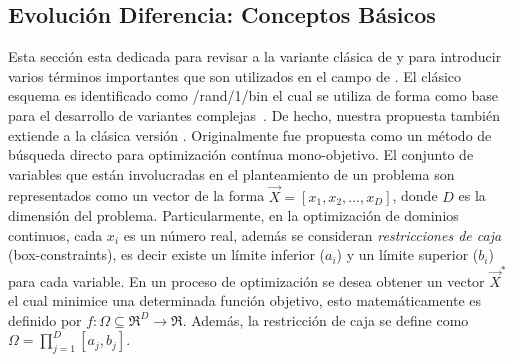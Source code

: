 \subsection{Evolución Diferencia: Conceptos Básicos}

Esta sección esta dedicada para revisar a la variante clásica de \DE{} y para introducir varios términos importantes que son utilizados en el campo de \DE{}.
%
El clásico esquema \DE{} es identificado como \DE{}/rand/1/bin el cual se utiliza de forma como base para el desarrollo de variantes complejas~\cite{das2011differential}.
%
De hecho, nuestra propuesta también extiende a la clásica versión \DE{}.
%
Originalmente \DE{} fue propuesta como un método de búsqueda directo para optimización contínua mono-objetivo.
%
El conjunto de variables que están involucradas en el planteamiento de un problema son representados como un vector de la forma $\vec{X} = [x_1, x_2, ..., x_D]$, donde $D$ es la dimensión del problema.
%
Particularmente, en la optimización de dominios continuos, cada $x_i$ es un número real, además se consideran \textit{restricciones de caja} (box-constraints), es decir existe un límite inferior ($a_{i}$) y un límite superior ($b_{i}$) para cada variable.
%
En un proceso de optimización se desea obtener un vector $\vec{X}^*$ el cual minimice una determinada función objetivo, esto matemáticamente es definido por $f : \Omega \subseteq \Re^D \rightarrow \Re$.
%
Además, la restricción de caja se define como $\Omega = {\prod}_{j=1}^{D} [a_{j}, b_{j}]$.

